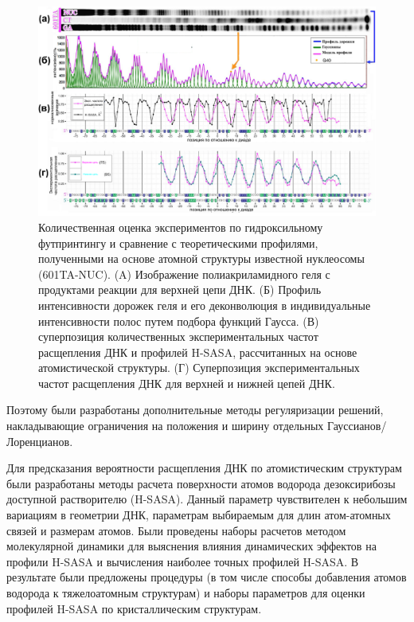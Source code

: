 \begin{figure}[H]
    \centering
    \includegraphics[width=\textwidth]{images/p5/part5_2_nar/p5_2_f5.pdf}
    \caption[Количественная оценка экспериментов по гидроксильному футпринтингу и сравнение с теоретическими профилями, полученными на основе атомной структуры известной нуклеосомы (601TA-NUC)]{Количественная оценка экспериментов по гидроксильному футпринтингу и сравнение с теоретическими профилями, полученными на основе атомной структуры известной нуклеосомы (601TA-NUC). (A) Изображение полиакриламидного геля с продуктами реакции для верхней цепи ДНК. (Б) Профиль интенсивности дорожек геля и его деконволюция в индивидуальные интенсивности полос путем подбора функций Гаусса. (В) суперпозиция количественных экспериментальных частот расщепления ДНК и профилей H-SASA, рассчитанных на основе атомистической структуры. (Г) Суперпозиция экспериментальных частот расщепления ДНК для верхней и нижней цепей ДНК.}
    \label{fig:p5:p5_2_f5}
\end{figure}

\noindent
 Поэтому были разработаны дополнительные методы регуляризации решений, накладывающие ограничения на положения и ширину отдельных Гауссианов/Лоренцианов.

Для предсказания вероятности расщепления ДНК по атомистическим структурам были разработаны методы расчета поверхности атомов водорода дезоксирибозы доступной растворителю (H-SASA). Данный параметр чувствителен к небольшим вариациям в геометрии ДНК, параметрам выбираемым для длин атом-атомных связей и размерам атомов. Были проведены наборы расчетов методом молекулярной динамики для выяснения влияния динамических эффектов на профили H-SASA и вычисления наиболее точных профилей H-SASA. В результате были предложены процедуры (в том числе способы добавления атомов водорода к тяжелоатомным структурам) и наборы параметров для оценки профилей H-SASA по кристаллическим структурам.


